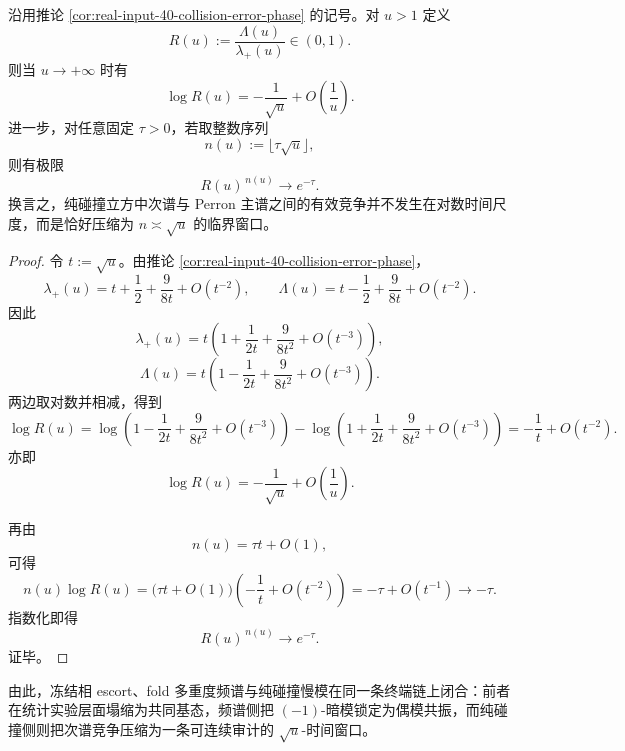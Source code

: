 \begin{theorem}\label{thm:xi-time-part9u-pure-collision-sqrtu-critical-window}
沿用推论 \ref{cor:real-input-40-collision-error-phase} 的记号。对 \(u>1\) 定义
\[
R(u):=\frac{\Lambda(u)}{\lambda_+(u)}\in(0,1).
\]
则当 \(u\to+\infty\) 时有
\[
\log R(u)
=
-\frac{1}{\sqrt u}
+O\!\left(\frac1u\right).
\]
进一步，对任意固定 \(\tau>0\)，若取整数序列
\[
n(u):=\lfloor \tau\sqrt u\rfloor,
\]
则有极限
\[
R(u)^{\,n(u)}\longrightarrow e^{-\tau}.
\]
换言之，纯碰撞立方中次谱与 Perron 主谱之间的有效竞争并不发生在对数时间尺度，而是恰好压缩为 \(n\asymp \sqrt u\) 的临界窗口。
\end{theorem}
\begin{proof}
令 \(t:=\sqrt u\)。由推论 \ref{cor:real-input-40-collision-error-phase}，
\[
\lambda_+(u)=t+\frac12+\frac{9}{8t}+O(t^{-2}),
\qquad
\Lambda(u)=t-\frac12+\frac{9}{8t}+O(t^{-2}).
\]
因此
\[
\lambda_+(u)
=
t\left(
1+\frac{1}{2t}+\frac{9}{8t^2}+O(t^{-3})
\right),
\]
\[
\Lambda(u)
=
t\left(
1-\frac{1}{2t}+\frac{9}{8t^2}+O(t^{-3})
\right).
\]
两边取对数并相减，得到
\[
\log R(u)
=
\log\!\left(
1-\frac{1}{2t}+\frac{9}{8t^2}+O(t^{-3})
\right)
-
\log\!\left(
1+\frac{1}{2t}+\frac{9}{8t^2}+O(t^{-3})
\right)
=
-\frac{1}{t}+O(t^{-2}).
\]
亦即
\[
\log R(u)=-\frac{1}{\sqrt u}+O\!\left(\frac1u\right).
\]

再由
\[
n(u)=\tau t+O(1),
\]
可得
\[
n(u)\log R(u)
=
\bigl(\tau t+O(1)\bigr)
\left(-\frac{1}{t}+O(t^{-2})\right)
=
-\tau+O(t^{-1})
\longrightarrow
-\tau.
\]
指数化即得
\[
R(u)^{\,n(u)}\to e^{-\tau}.
\]
证毕。
\end{proof}

\noindent
由此，冻结相 escort、fold 多重度频谱与纯碰撞慢模在同一条终端链上闭合：前者在统计实验层面塌缩为共同基态，频谱侧把 \((-1)\)-暗模锁定为偶模共振，而纯碰撞侧则把次谱竞争压缩为一条可连续审计的 \(\sqrt u\)-时间窗口。

\endinput
